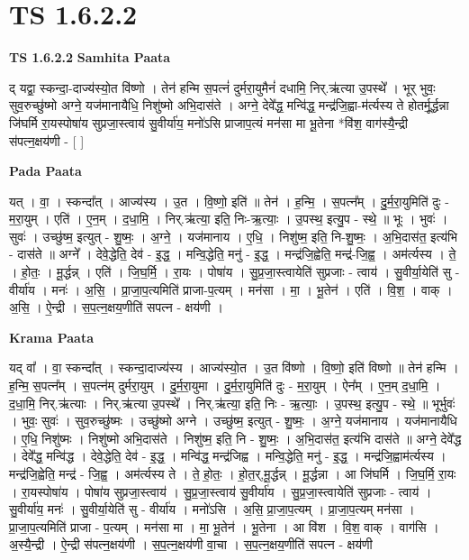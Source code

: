 \documentclass[17pt]{extarticle}
\begin{document}
\section*{ TS 1.6.2.2 }

\textbf{TS 1.6.2.2 } \newline
\textbf{Samhita Paata} \newline

द् यद्वा॒ स्कन्दा॒-दाज्य॑स्यो॒त वि॑ष्णो । तेन॑ हन्मि स॒पत्नं॑ दुर्मरा॒युमैनं॑ दधामि॒ निर्.ऋ॑त्या उ॒पस्थे᳚ । भूर् भुवः॒ सुव॒रुच्छु॑ष्मो अग्ने॒ यज॑मानायैधि॒ निशु॑ष्मो अभि॒दास॑ते । अग्ने॒ देवे᳚द्ध॒ मन्वि॑द्ध॒ मन्द्र॑जि॒ह्वा-म॑र्त्यस्य ते होतर्मू॒र्द्धन्ना जि॑घर्मि रा॒यस्पोषा॑य सुप्रजा॒स्त्वाय॑ सु॒वीर्या॑य॒ मनो॑ऽसि प्राजाप॒त्यं मन॑सा मा भू॒तेना *वि॑श॒ वाग॑स्यै॒न्द्री स॑पत्न॒क्षय॑णी - [ ] \newline

\textbf{Pada Paata} \newline

यत् । वा॒ । स्कन्दा᳚त् । आज्य॑स्य । उ॒त । वि॒ष्णो॒ इति॑ ॥ तेन॑ । ह॒न्मि॒ । स॒पत्न᳚म् । दु॒र्म॒रा॒युमिति॑ दुः - म॒रा॒युम् । एति॑ । ए॒न॒म् । द॒धा॒मि॒ । निर्.ऋ॑त्या॒ इति॒ निः-ऋ॒त्याः॒ । उ॒पस्थ॒ इत्यु॒प - स्थे॒ ॥ भूः । भुवः॑ । सुवः॑ । उच्छु॑ष्म॒ इत्युत् - शु॒ष्मः॒ । अ॒ग्ने॒ । यज॑मानाय । ए॒धि॒ । निशु॑ष्म॒ इति॒ नि-शु॒ष्मः॒ । अ॒भि॒दास॑त॒ इत्य॑भि - दास॑ते ॥ अग्ने᳚ । देवे॒द्धेति॒ देव॑ - इ॒द्ध॒ । मन्वि॒द्धेति॒ मनु॑ - इ॒द्ध॒ । मन्द्र॑जि॒ह्वेति॒ मन्द्र॑-जि॒ह्व॒ । अम॑र्त्यस्य । ते॒ । हो॒तः॒ । मू॒र्द्धन्न् । एति॑ । जि॒घ॒र्मि॒ । रा॒यः । पोषा॑य । सु॒प्र॒जा॒स्त्वायेति॑ सुप्रजाः - त्वाय॑ । सु॒वीर्या॒येति॑ सु - वीर्या॑य । मनः॑ । अ॒सि॒ । प्रा॒जा॒प॒त्यमिति॑ प्राजा-प॒त्यम् । मन॑सा । मा॒ । भू॒तेन॑ । एति॑ । वि॒श॒ । वाक् । अ॒सि॒ । ऐ॒न्द्री । स॒प॒त्न॒क्षय॒णीति॑ सपत्न - क्षय॑णी ।  \newline


\textbf{Krama Paata} \newline

यद् वा᳚ । वा॒ स्कन्दा᳚त् । स्कन्दा॒दाज्य॑स्य । आज्य॑स्यो॒त । उ॒त वि॑ष्णो । वि॒ष्णो॒ इति॑ विष्णो ॥ तेन॑ हन्मि । ह॒न्मि॒ स॒पत्न᳚म् । स॒पत्न॑म् दुर्मरा॒युम् । दु॒र्म॒रा॒युमा । दु॒र्म॒रा॒युमिति॑ दुः - म॒रा॒युम् । ऐन᳚म् । ए॒न॒म् द॒धा॒मि॒ । द॒धा॒मि॒ निर्.ऋ॑त्याः । निर्.ऋ॑त्या उ॒पस्थे᳚ । निर्.ऋ॑त्या॒ इति॒ निः - ऋ॒त्याः॒ । उ॒पस्थ॒ इत्यु॒प - स्थे॒ ॥ भूर्भुवः॑ । भुवः॒ सुवः॑ । सुव॒रुच्छु॑ष्मः । उच्छु॑ष्मो अग्ने । उच्छु॑ष्म॒ इत्युत् - शु॒ष्मः॒ । अ॒ग्ने॒ यज॑मानाय । यज॑मानायैधि । ए॒धि॒ निशु॑ष्मः । निशु॑ष्मो अभि॒दास॑ते । निशु॑ष्म॒ इति॒ नि - शु॒ष्मः॒ । अ॒भि॒दास॑त॒ इत्य॑भि दास॑ते ॥ अग्ने॒ देवे᳚द्ध । देवे᳚द्ध॒ मन्वि॑द्ध । देवे॒द्धेति॒ देव॑ - इ॒द्ध॒ । मन्वि॑द्ध॒ मन्द्र॑जिह्व । मन्वि॒द्धेति॒ मनु॑ - इ॒द्ध॒ । 
मन्द्र॑जि॒ह्वाम॑र्त्यस्य । मन्द्र॑जि॒ह्वेति॒ मन्द्र॑ - जि॒ह्व॒ । अम॑र्त्यस्य ते । ते॒ हो॒तः॒ । हो॒त॒र्,मू॒र्द्धन्न् । मू॒र्द्धन्ना । आ जि॑घर्मि । जि॒घ॒र्मि॒ रा॒यः । रा॒यस्पोषा॑य । पोषा॑य सुप्रजा॒स्त्वाय॑ । सु॒प्र॒जा॒स्त्वाय॑ सु॒वीर्या॑य । सु॒प्र॒जा॒स्त्वायेति॑ सुप्रजाः - त्वाय॑ । सु॒वीर्या॑य॒ मनः॑ । सु॒वीर्या॒येति॑ सु - वीर्या॑य । मनो॑ऽसि । अ॒सि॒ प्रा॒जा॒प॒त्यम् । प्रा॒जा॒प॒त्यम् मन॑सा । प्रा॒जा॒प॒त्यमिति॑ प्राजा - प॒त्यम् । मन॑सा मा । मा॒ भू॒तेन॑ । भू॒तेना । आ वि॑श । वि॒श॒ वाक् । वाग॑सि । अ॒स्यै॒न्द्री । ऐ॒न्द्री स॑पत्न॒क्षय॑णी । स॒प॒त्न॒क्षय॑णी वा॒चा । स॒प॒त्न॒क्षय॒णीति॑ सपत्न - क्षय॑णी \newline
\end{document}
